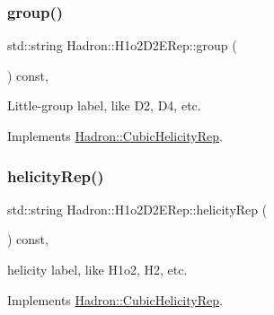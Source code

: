 \mbox{\label{structHadron_1_1H1o2D2ERep_a932070dfad7ef632122da818917b4fcc}} 
\subsubsection{\texorpdfstring{group()}{group()}\hspace{0.1cm}{\footnotesize\ttfamily [5/5]}}
{\footnotesize\ttfamily std\+::string Hadron\+::\+H1o2\+D2\+E\+Rep\+::group (\begin{DoxyParamCaption}{ }\end{DoxyParamCaption}) const\hspace{0.3cm}{\ttfamily [inline]}, {\ttfamily [virtual]}}

Little-\/group label, like D2, D4, etc. 

Implements \mbox{\hyperlink{structHadron_1_1CubicHelicityRep_a101a7d76cd8ccdad0f272db44b766113}{Hadron\+::\+Cubic\+Helicity\+Rep}}.

\mbox{\label{structHadron_1_1H1o2D2ERep_a8c9ee9d587a013968ba36b769ddccfc3}} 
\subsubsection{\texorpdfstring{helicityRep()}{helicityRep()}\hspace{0.1cm}{\footnotesize\ttfamily [1/3]}}
{\footnotesize\ttfamily std\+::string Hadron\+::\+H1o2\+D2\+E\+Rep\+::helicity\+Rep (\begin{DoxyParamCaption}{ }\end{DoxyParamCaption}) const\hspace{0.3cm}{\ttfamily [inline]}, {\ttfamily [virtual]}}

helicity label, like H1o2, H2, etc. 

Implements \mbox{\hyperlink{structHadron_1_1CubicHelicityRep_af1096946b7470edf0a55451cc662f231}{Hadron\+::\+Cubic\+Helicity\+Rep}}.

\mbox{\label{structHadron_1_1H1o2D2ERep_a8c9ee9d587a013968ba36b769ddccfc3}} 
